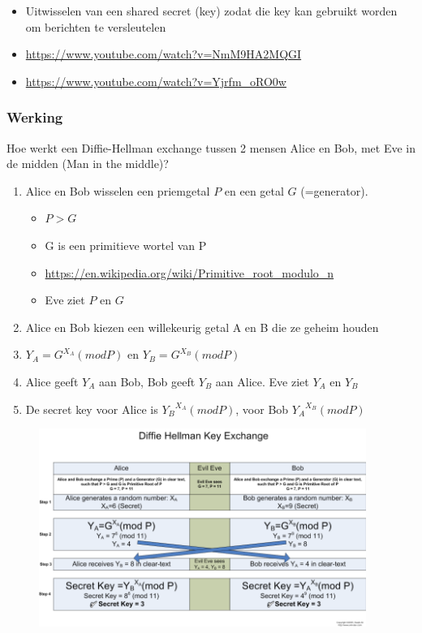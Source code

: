 \documentclass{article}
\begin{document}
\begin{itemize}
    \item Uitwisselen van een shared secret (key) zodat die key kan gebruikt worden om berichten te versleutelen
    \item \url{https://www.youtube.com/watch?v=NmM9HA2MQGI}
    \item \url{https://www.youtube.com/watch?v=Yjrfm_oRO0w}
\end{itemize}

\subsubsection{Werking}

Hoe werkt een Diffie-Hellman exchange tussen 2 mensen Alice en Bob, met Eve in de midden (Man in the middle)?

\begin{enumerate}
    \item Alice en Bob wisselen een priemgetal $P$ en een getal $G$ (=generator).
    \begin{itemize}
        \item $P > G$
        \item G is een primitieve wortel van P
        \item \url{https://en.wikipedia.org/wiki/Primitive\_root\_modulo\_n}
        \item Eve ziet $P$ en $G$
    \end{itemize} 
    \item Alice en Bob kiezen een willekeurig getal A en B die ze geheim houden
    \item $Y_A = G^{X_A} (mod P)$ en $Y_B = G^{X_B} (mod P)$
    \item Alice geeft $Y_A$ aan Bob, Bob geeft $Y_B$ aan Alice. Eve ziet $Y_A$ en $Y_B$
    \item De secret key voor Alice is ${Y_B}^{X_A} (mod P)$, voor Bob ${Y_A}^{X_B} (mod P)$
\end{enumerate}

\begin{figure}[H]
    \centering
    \includegraphics[width=0.95\textwidth]{diffie-hellman.png}
    \caption{}
\end{figure}
\end{document}
